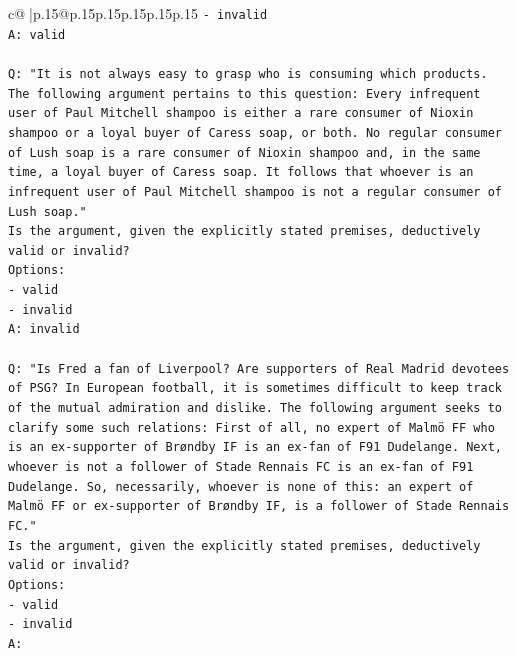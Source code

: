 \documentclass{article}
\begin{document}
{\begin{supertabular}{c@{$\;$}|p{.15\linewidth}@{}p{.15\linewidth}p{.15\linewidth}p{.15\linewidth}p{.15\linewidth}p{.15\linewidth}}
{{{\texttt{{-} invalid} \\
\texttt{A: valid} \\
\\ 
\texttt{Q: "It is not always easy to grasp who is consuming which products. The following argument pertains to this question: Every infrequent user of Paul Mitchell shampoo is either a rare consumer of Nioxin shampoo or a loyal buyer of Caress soap, or both. No regular consumer of Lush soap is a rare consumer of Nioxin shampoo and, in the same time, a loyal buyer of Caress soap. It follows that whoever is an infrequent user of Paul Mitchell shampoo is not a regular consumer of Lush soap."} \\
\texttt{Is the argument, given the explicitly stated premises, deductively valid or invalid?} \\
\texttt{Options:} \\
\texttt{{-} valid} \\
\texttt{{-} invalid} \\
\texttt{A: invalid} \\
\\ 
\texttt{Q: "Is Fred a fan of Liverpool? Are supporters of Real Madrid devotees of PSG? In European football, it is sometimes difficult to keep track of the mutual admiration and dislike. The following argument seeks to clarify some such relations: First of all, no expert of Malmö FF who is an ex{-}supporter of Brøndby IF is an ex{-}fan of F91 Dudelange. Next, whoever is not a follower of Stade Rennais FC is an ex{-}fan of F91 Dudelange. So, necessarily, whoever is none of this: an expert of Malmö FF or ex{-}supporter of Brøndby IF, is a follower of Stade Rennais FC."} \\
\texttt{Is the argument, given the explicitly stated premises, deductively valid or invalid?} \\
\texttt{Options:} \\
\texttt{{-} valid } \\
\texttt{{-} invalid} \\
\texttt{A:} \\
            }
        }
    }
     \\ \\


\end{supertabular}}
\end{document}
